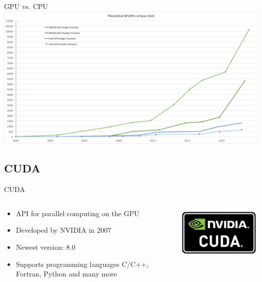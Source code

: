 \documentclass{beamer}
\begin{document}
\begin{frame}{GPU vs. CPU}
	\includegraphics[width=1.0\textwidth]{gpu_comparison.png}
\end{frame}

\subsection*{CUDA}

\begin{frame}{CUDA}
	\begin{columns}[T]
		\begin{column}{0.8\textwidth}
			\begin{itemize}
				\item API for parallel computing on the GPU
				\item Developed by NVIDIA in 2007 
				\item Newest version: 8.0
				\item Supports programming languages C/C++, Fortran, Python and many more
			\end{itemize}
		\end{column}
		\begin{column}{0.2\textwidth}
			\includegraphics[width=1.0\textwidth]{cuda_logo.jpg}
		\end{column}
	\end{columns}
\end{frame}
\end{document}
